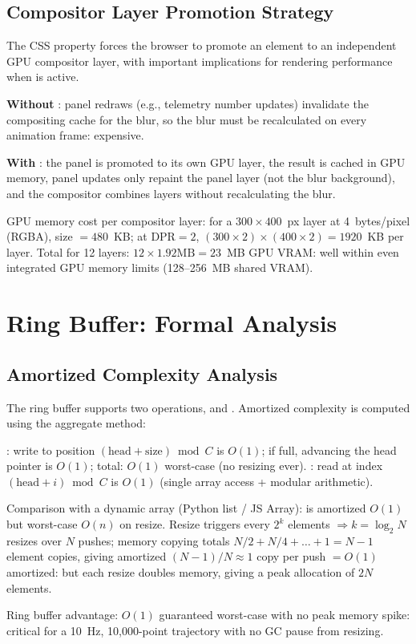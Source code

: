\subsection{Compositor Layer Promotion Strategy}

The CSS property  forces the browser to promote an element to an independent GPU compositor layer, with important implications for rendering performance when  is active.

\begin{eqblock}
\textbf{Without }: panel redraws (e.g., telemetry number updates) invalidate the compositing cache for the  blur, so the blur must be recalculated on every animation frame: expensive.

\textbf{With }: the panel is promoted to its own GPU layer, the  result is cached in GPU memory, panel updates only repaint the panel layer (not the blur background), and the compositor combines layers without recalculating the blur.

GPU memory cost per compositor layer: for a $300\times400$~px layer at 4~bytes/pixel (RGBA), size $=480$~KB; at DPR$=2$, $(300\times2)\times(400\times2)=1920$~KB per layer. Total for 12 layers: $12\times1.92\text{MB}=23$~MB GPU VRAM: well within even integrated GPU memory limits (128--256~MB shared VRAM).
\end{eqblock}

\section{Ring Buffer: Formal Analysis}

\subsection{Amortized Complexity Analysis}

The ring buffer supports two operations,  and . Amortized complexity is computed using the aggregate method:

\begin{eqblock}
: write to position $(\text{head}+\text{size})\bmod C$ is $O(1)$; if full, advancing the head pointer is $O(1)$; total: $O(1)$ worst-case (no resizing ever). : read at index $(\text{head}+i)\bmod C$ is $O(1)$ (single array access + modular arithmetic).

Comparison with a dynamic array (Python list / JS Array):  is amortized $O(1)$ but worst-case $O(n)$ on resize. Resize triggers every $2^k$ elements $\Rightarrow k=\log_2 N$ resizes over $N$ pushes; memory copying totals $N/2+N/4+\dots+1 = N-1$ element copies, giving amortized $(N-1)/N\approx1$ copy per push $= O(1)$ amortized: but each resize doubles memory, giving a peak allocation of $2N$ elements.

Ring buffer advantage: $O(1)$ guaranteed worst-case with no peak memory spike: critical for a 10~Hz, 10,000-point trajectory with no GC pause from resizing.
\end{eqblock}

